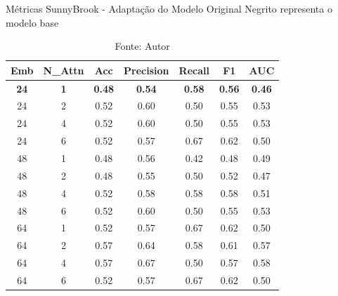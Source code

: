 \begin{table}[htbp]
\centering
\caption{Métricas SunnyBrook - Adaptação do Modelo Original
\newline Negrito representa o modelo base}
\begin{tabular}{ccccccc}
\toprule
\textbf{Emb} & \textbf{N\_Attn} & \textbf{Acc} & \textbf{Precision} & \textbf{Recall} & \textbf{F1} & \textbf{AUC} \\
\midrule
\textbf{24} & \textbf{1} & \textbf{0.48} & \textbf{0.54} & \textbf{0.58} & \textbf{0.56} & \textbf{0.46} \\
24 & 2 & 0.52 & 0.60 & 0.50 & 0.55 & 0.53 \\
24 & 4 & 0.52 & 0.60 & 0.50 & 0.55 & 0.53 \\
24 & 6 & 0.52 & 0.57 & 0.67 & 0.62 & 0.50 \\
48 & 1 & 0.48 & 0.56 & 0.42 & 0.48 & 0.49 \\
48 & 2 & 0.48 & 0.55 & 0.50 & 0.52 & 0.47 \\
48 & 4 & 0.52 & 0.58 & 0.58 & 0.58 & 0.51 \\
48 & 6 & 0.52 & 0.60 & 0.50 & 0.55 & 0.53 \\
64 & 1 & 0.52 & 0.57 & 0.67 & 0.62 & 0.50 \\
64 & 2 & 0.57 & 0.64 & 0.58 & 0.61 & 0.57 \\
64 & 4 & 0.57 & 0.67 & 0.50 & 0.57 & 0.58 \\
64 & 6 & 0.52 & 0.57 & 0.67 & 0.62 & 0.50 \\
\bottomrule
\end{tabular}
\caption*{Fonte: Autor}
\label{tab:metrics_sunny_orig}
\end{table}


